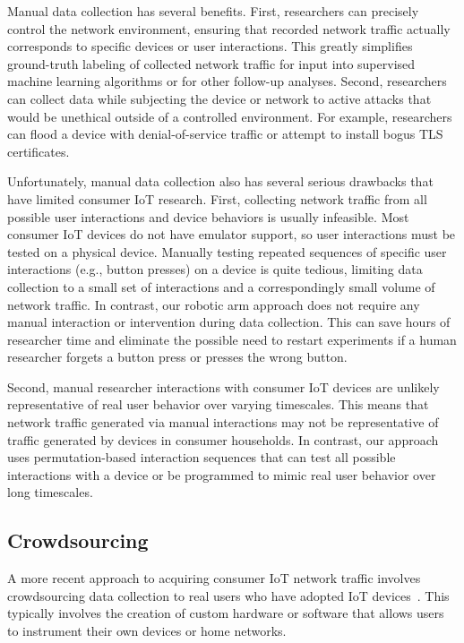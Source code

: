 Manual data collection has several benefits. First, researchers can precisely control the network environment, ensuring that recorded network traffic actually corresponds to specific devices or user interactions. This greatly simplifies ground-truth labeling of collected network traffic for input into supervised machine learning algorithms or for other follow-up analyses.
Second, researchers can collect data while subjecting the device or network to active attacks that would be unethical outside of a controlled environment. For example, researchers can flood a device with denial-of-service traffic or attempt to install bogus TLS certificates. 

Unfortunately, manual data collection also has several serious drawbacks that have limited consumer IoT research. First, collecting network traffic from all possible user interactions and device behaviors is usually infeasible. 
Most consumer IoT devices do not have emulator support, so user interactions must be tested on a physical device.
Manually testing repeated sequences of specific user interactions (e.g., button presses) on a device is quite tedious, limiting data collection to a small set of interactions and a correspondingly small volume of network traffic. 
In contrast, our robotic arm approach does not require any manual interaction or intervention during data collection. This can save hours of researcher time and eliminate the possible need to restart experiments if a human researcher forgets a button press or presses the wrong button. 

Second, manual researcher interactions with consumer IoT devices are unlikely representative of real user behavior over varying timescales. This means that network traffic generated via manual interactions may not be representative of traffic generated by devices in consumer households. In contrast, our approach uses permutation-based interaction sequences that can test all possible interactions with a device or be programmed to mimic real user behavior over long timescales.

\subsection{Crowdsourcing}
A more recent approach to acquiring consumer IoT network traffic involves crowdsourcing data collection to real users who have adopted IoT devices~\cite{huang2020iot, mazhar2020characterizing}. This typically involves the creation of custom hardware or software that allows users to instrument their own devices or home networks.

